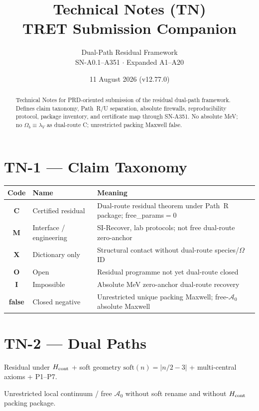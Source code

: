 \documentclass[11pt,a4paper]{article}
\title{Technical Notes (TN)\\TRET Submission Companion}
\author{Dual-Path Residual Framework\\SN-A0.1--A351 $\cdot$ Expanded A1--A20}
\date{11 August 2026 (v12.77.0)}
\begin{document}
\maketitle
\begin{abstract}
Technical Notes for PRD-oriented submission of the residual dual-path framework.
Defines claim taxonomy, Path~R/U separation, absolute firewalls, reproducibility
protocol, package inventory, and certificate map through SN-A351.
No absolute MeV; no $\Omega_b\equiv\lambda_V$ as dual-route C; unrestricted packing Maxwell false.
\end{abstract}

\tableofcontents
\newpage

\section{TN-1 --- Claim Taxonomy}
\begin{center}
\begin{tabular}{@{}clp{8.2cm}@{}}
\toprule
Code & Name & Meaning \\
\midrule
\textbf{C} & Certified residual & Dual-route residual theorem under Path~R package; free\_params${=}0$ \\
\textbf{M} & Interface / engineering & SI-Recover, lab protocols; not free dual-route zero-anchor \\
\textbf{X} & Dictionary only & Structural contact without dual-route species/$\Omega$ ID \\
\textbf{O} & Open & Residual programme not yet dual-route closed \\
\textbf{I} & Impossible & Absolute MeV zero-anchor dual-route recovery \\
\textbf{false} & Closed negative & Unrestricted unique packing Maxwell; free-$\mathcal{A}_0$ absolute Maxwell \\
\bottomrule
\end{tabular}
\end{center}

\section{TN-2 --- Dual Paths}
\begin{definition}[Path R]
Residual under $H_{\rm cont}$ + soft geometry $\mathrm{soft}(n)=|n/2-3|$ + multi-central axioms + P1--P7.
\end{definition}
\begin{definition}[Path U]
Unrestricted local continuum / free $\mathcal{A}_0$ without soft rename and without $H_{\rm cont}$ packing package.
\end{definition}
\end{document}
